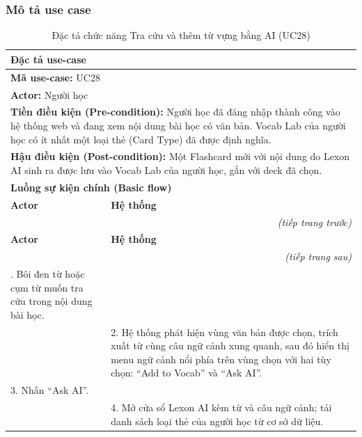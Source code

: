 \subsubsection{Mô tả use case}
\renewcommand{\arraystretch}{1.3}
\setlength{\tbu}{\dimexpr(\linewidth - 4\tabcolsep - 3\arrayrulewidth)/2\relax}
\begin{longtable}{|p{\tbu}|p{\tbu}|}
    \caption{Đặc tả chức năng Tra cứu và thêm từ vựng bằng AI (UC28)} \label{tab:uc28_spec} \\
    
    \hline
    \multicolumn{2}{|l|}{\textbf{Đặc tả use-case}} \\ \hline
    \multicolumn{2}{|l|}{\textbf{Mã use-case:} UC28} \\ \hline
    \multicolumn{2}{|l|}{\textbf{Actor:} Người học} \\ \hline
    \multicolumn{2}{|p{\dimexpr\linewidth - 2\tabcolsep - 2\arrayrulewidth\relax}|}{\textbf{Tiền điều kiện (Pre-condition):} Người học đã đăng nhập thành công vào hệ thống web và đang xem nội dung bài học có văn bản. Vocab Lab của người học có ít nhất một loại thẻ (Card Type) đã được định nghĩa.} \\ \hline
    \multicolumn{2}{|p{\dimexpr\linewidth - 2\tabcolsep - 2\arrayrulewidth\relax}|}{\textbf{Hậu điều kiện (Post-condition):} Một Flashcard mới với nội dung do Lexon AI sinh ra được lưu vào Vocab Lab của người học, gắn với deck đã chọn.} \\ \hline
    \multicolumn{2}{|l|}{\textbf{Luồng sự kiện chính (Basic flow)}} \\ \hline
    \textbf{Actor} & \textbf{Hệ thống} \\ \hline
    \endfirsthead
    \multicolumn{2}{r}{\textit{(tiếp trang trước)}} \\
    \hline
    \textbf{Actor} & \textbf{Hệ thống} \\ \hline
    \endhead
    \hline
    \multicolumn{2}{r}{\textit{(tiếp trang sau)}} \\
    \endfoot
    \endlastfoot
    1. Bôi đen từ hoặc cụm từ muốn tra cứu trong nội dung bài học. & \\ \hline
    & 2. Hệ thống phát hiện vùng văn bản được chọn, trích xuất từ cùng câu ngữ cảnh xung quanh, sau đó hiển thị menu ngữ cảnh nổi phía trên vùng chọn với hai tùy chọn: ``Add to Vocab'' và ``Ask AI''. \\ \hline
    3. Nhấn ``Ask AI''. & \\ \hline
    & 4. Mở cửa sổ Lexon AI kèm từ và câu ngữ cảnh; tải danh sách loại thẻ của người học từ cơ sở dữ liệu. \\ \hline

\end{longtable}
